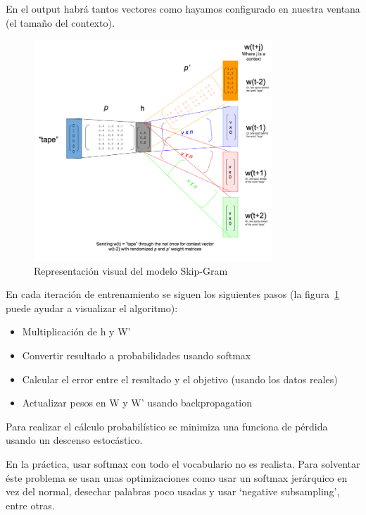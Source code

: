 \documentclass[withindex, glossary]{cam-thesis}
\begin{document}
En el output habrá tantos vectores como hayamos configurado en nuestra ventana (el tamaño del contexto).

\begin{figure}[!htbp]
    \centering
    \includegraphics[width=0.8\textwidth]{./figures/skip-gram-exp.png}
    \caption{Representación visual del modelo Skip-Gram\cite{skip-gram-exp}}\label{skip-gram-exp}
\end{figure}

En cada iteración de entrenamiento se siguen los siguientes pasos (la figura~\ref{skip-gram-exp} puede ayudar a visualizar el algoritmo):

\begin{itemize}
    \item Multiplicación de h y W'
    \item Convertir resultado a probabilidades usando \gls{softmax}
    \item Calcular el error entre el resultado y el objetivo (usando los datos reales)
    \item Actualizar pesos en W y W' usando backpropagation
\end{itemize}

Para realizar el cálculo probabilístico se minimiza una funciona de pérdida usando un descenso estocástico\cite{DBLP:journals/corr/Rong14}.

En la práctica, usar softmax con todo el vocabulario no es realista. Para solventar éste problema se usan unas optimizaciones como usar un softmax jerárquico en vez del normal, desechar palabras poco usadas y usar `negative subsampling', entre otras.
\end{document}
